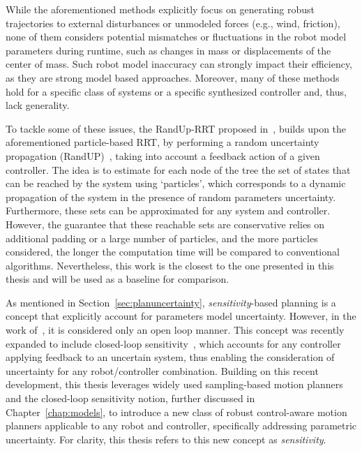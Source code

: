 While the aforementioned methods explicitly focus on generating robust trajectories to external disturbances or unmodeled forces (e.g., wind, friction), none of them considers potential mismatches or fluctuations in the robot model parameters during runtime, such as changes in mass or displacements of the center of mass.
Such robot model inaccuracy can strongly impact their efficiency, as they are strong model based approaches. 
Moreover, many of these methods hold for a specific class of systems or a specific synthesized controller and, thus, lack generality.

To tackle some of these issues, the RandUp-RRT proposed in~\cite{cRandUpRRT}, builds upon the aforementioned particle-based RRT, by performing a random uncertainty propagation (RandUP)~\cite{cRandUP}, taking into account a feedback action of a given controller.
The idea is to estimate for each node of the tree the set of states that can be reached by the system using `particles', which corresponds to a dynamic propagation of the system in the presence of random parameters uncertainty.
Furthermore, these sets can be approximated for any system and controller.
However, the guarantee that these reachable sets are conservative relies on additional padding or a large number of particles, and the more particles considered, the longer the computation time will be compared to conventional algorithms.
Nevertheless, this work is the closest to the one presented in this thesis and will be used as a baseline for comparison.

As mentioned in Section~\ref{sec:planuncertainty}, \emph{sensitivity}-based planning is a concept that explicitly account for parameters model uncertainty.
However, in the work of~\cite{cSensi1,cSensi2}, it is considered only an open loop manner.
This concept was recently expanded to include closed-loop sensitivity~\cite{cPi,cTh}, which accounts for any controller applying feedback to an uncertain system, thus enabling the consideration of uncertainty for any robot/controller combination. 
Building on this recent development, this thesis leverages widely used sampling-based motion planners and the closed-loop sensitivity notion, further discussed in Chapter~\ref{chap:models}, to introduce a new class of robust control-aware motion planners applicable to any robot and controller, specifically addressing parametric uncertainty. 
For clarity, this thesis refers to this new concept as \emph{sensitivity}.